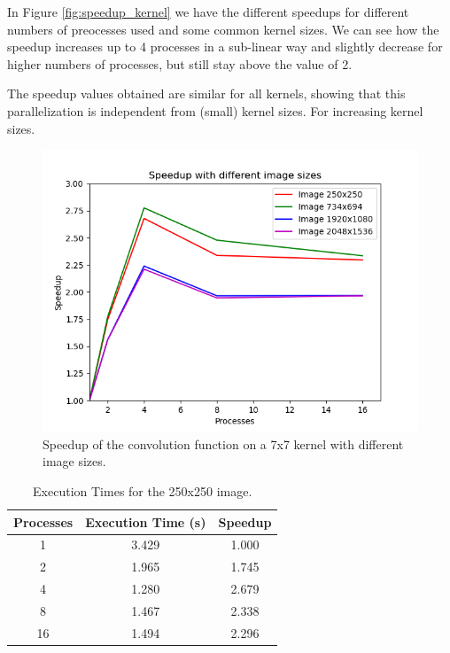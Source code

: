 \documentclass[10pt,twocolumn,letterpaper]{article}
\begin{document}
In Figure \ref{fig:speedup_kernel} we have the different speedups for different numbers of preocesses used and some common kernel sizes. We can see how the speedup increases up to 4 processes in a sub-linear way and slightly decrease for higher numbers of processes, but still stay above the value of 2.
 
The speedup values obtained are similar for all kernels, showing that this parallelization is independent from (small) kernel sizes.
For increasing kernel sizes.

\begin{figure}[H]
	\includegraphics[width=\linewidth]{images/speedup_by_img_sizes.png}
	\caption{Speedup of the convolution function on a 7x7 kernel with different image sizes.}
	\label{fig:speedup_img}
\end{figure}

\begin{table}[H]
	\begin{center}
		\begin{tabular}{|c|c|c|}
			\hline
			Processes & Execution Time (s) & Speedup \\
			\hline
			1 & 3.429 & 1.000 \\
			2 & 1.965 & 1.745 \\
			4 & 1.280 & 2.679 \\
			8 & 1.467 & 2.338 \\
			16 & 1.494 & 2.296 \\
			\hline
		\end{tabular}
	\end{center}
	\caption{Execution Times for the 250x250 image.}
	\label{tab:speedup_k_i_1}
\end{table}
\end{document}
